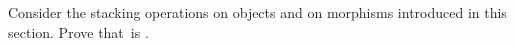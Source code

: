 
\begin{exercise}
    \label{ex:relassocstack}
    Consider the stacking operations on objects and on morphisms introduced in this section.
    Prove that~\RelL is  .
\end{exercise}


